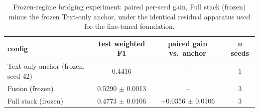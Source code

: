 \begin{table}[t]
\centering
\caption{Frozen-regime bridging experiment: paired per-seed gain, Full stack (frozen) minus the frozen Text-only anchor, under the identical residual apparatus used for the fine-tuned foundation.}
\label{tab:frozen-bridging}
\begin{tabular}{lccc}
\toprule
config & test weighted F1 & paired gain vs.\ anchor & n seeds \\
\midrule
Text-only anchor (frozen, seed 42) & 0.4416 & -- & 1 \\
Fusion (frozen) & 0.5290 $\pm$ 0.0013 & -- & 3 \\
Full stack (frozen) & 0.4773 $\pm$ 0.0106 & +0.0356 $\pm$ 0.0106 & 3 \\
\bottomrule
\end{tabular}
\end{table}
